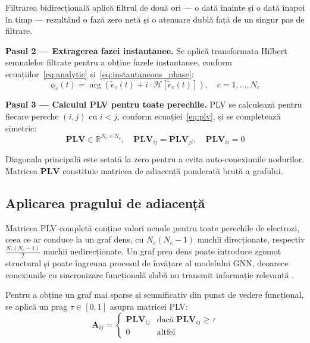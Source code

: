 \documentclass[12pt,a4paper]{report}
\theoremstyle{definition}
\theoremstyle{remark}
\begin{document}
\noindent Filtrarea bidirecțională aplică filtrul de două ori — o dată înainte și o dată înapoi în timp — rezultând o fază zero netă și o atenuare dublă față de un singur pas de filtrare.

\textbf{Pasul 2 — Extragerea fazei instantanee.} Se aplică transformata Hilbert semnalelor filtrate pentru a obține fazele instantanee, conform ecuațiilor~\eqref{eq:analytic} și~\eqref{eq:instantaneous_phase}:
\begin{equation}
    \phi_c(t) = \arg\!\left(\tilde{e}_c(t) + i \cdot \mathcal{H}[\tilde{e}_c(t)]\right), \quad c = 1, \ldots, N_c
    \label{eq:phase_extraction}
\end{equation}

\textbf{Pasul 3 — Calculul PLV pentru toate perechile.} PLV se calculează pentru fiecare pereche $(i, j)$ cu $i < j$, conform ecuației~\eqref{eq:plv}, și se completează simetric:
\begin{equation}
    \mathbf{PLV} \in \mathbb{R}^{N_c \times N_c}, \quad \mathbf{PLV}_{ij} = \mathbf{PLV}_{ji}, \quad \mathbf{PLV}_{ii} = 0
    \label{eq:plv_matrix}
\end{equation}

Diagonala principală este setată la zero pentru a evita auto-conexiunile nodurilor. Matricea $\mathbf{PLV}$ constituie matricea de adiacență ponderată brută a grafului.

\subsection{Aplicarea pragului de adiacență}

Matricea PLV completă conține valori nenule pentru toate perechile de electrozi, ceea ce ar conduce la un graf dens, cu $N_c(N_c-1)$ muchii direcționate, respectiv $\frac{N_c(N_c-1)}{2}$ muchii nedirecționate. Un graf prea dens poate introduce zgomot structural și poate îngreuna procesul de învățare al modelului GNN, deoarece conexiunile cu sincronizare funcțională slabă nu transmit informație relevantă \cite{rahman2025advancement}.

Pentru a obține un graf mai sparse și semnificativ din punct de vedere funcțional, se aplică un prag $\tau \in [0, 1]$ asupra matricei PLV:
\begin{equation}
    \mathbf{A}_{ij} =
    \begin{cases}
        \mathbf{PLV}_{ij} & \text{dacă } \mathbf{PLV}_{ij} \geq \tau \\
        0 & \text{altfel}
    \end{cases}
    \label{eq:threshold}
\end{equation}
\end{document}
